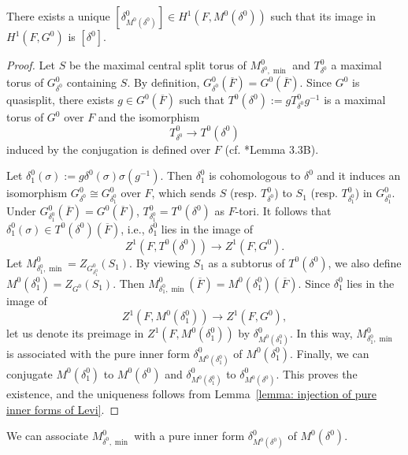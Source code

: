 \documentclass[11pt,letterpaper]{amsart}
\numberwithin{equation}{section}
\begin{document}
\begin{lemma}
\label{lemma: pure inner forms of Levi}
There exists a unique $[\delta^0_{M^0(\delta^0)}] \in H^1(F, M^0(\delta^0))$  such that its image in $H^1(F, G^0)$ is  $[\delta^0]$. 
\end{lemma}

\begin{proof}
Let $S$ be the maximal central split torus of $M^0_{\delta^0, \min}$ and $T^0_{\delta^0}$ a maximal torus of $G^0_{\delta^0}$ containing $S$. By definition, $G^0_{\delta^0}(\overline{F}) = G^0(\overline{F})$. Since $G^0$ is quasisplit, there exists $g \in G^0(\overline{F})$ such that $T^0(\delta^0) := gT^0_{\delta^0}g^{-1}$ is a maximal torus of $G^0$ over $F$ and the isomorphism 
\[
T^0_{\delta^0} \rightarrow T^0(\delta^0)
\]
induced by the conjugation is defined over $F$ (cf. \cite{KS99}*{Lemma 3.3B}). 

Let $\delta^0_1(\sigma) := g\delta^0(\sigma)\sigma(g^{-1})$. Then $\delta^0_1$ is cohomologous to $\delta^0$ and it induces an isomorphism $G^0_{\delta^0} \cong G^0_{\delta^0_1}$ over $F$, which sends $S$ (resp. $T^0_{\delta^0}$) to $S_1$ (resp. $T^0_{\delta^0_1}$) in $G^0_{\delta^0_1}$. Under $G^0_{\delta^0_1}(\overline{F}) = G^0(\overline{F})$, $T^0_{\delta^0_1} = T^0(\delta^0)$ as $F$-tori. It follows that $\delta^0_1(\sigma) \in T^0(\delta^0)(\overline{F})$, i.e., $\delta^0_1$ lies in the image of 
\[
Z^1(F, T^0(\delta^0)) \rightarrow Z^1(F, G^0).
\]
Let $M^0_{\delta^0_1, \min} = Z_{G^0_{\delta^0_1}}(S_1)$. By viewing $S_1$ as a subtorus of $T^0(\delta^0)$, we also define $M^0(\delta^0_1) = Z_{G^0}(S_1)$. Then $M^0_{\delta^0_1, \min}(\overline{F}) = M^0(\delta^0_1)(\overline{F})$. Since $\delta^0_1$ lies in the image of 
\[
Z^1(F, M^0(\delta^0_1)) \rightarrow Z^1(F, G^0),
\]
let us denote its preimage in $Z^1(F, M^0(\delta^0_1))$ by $\delta^0_{M^0(\delta^0_1)}$. In this way, $M^0_{\delta^0_1, \min}$ is associated with the pure inner form $\delta^0_{M^0(\delta^0_1)}$ of $M^0(\delta^0_1)$. Finally, we can conjugate $M^0(\delta^0_1)$ to $M^0(\delta^0)$ and $\delta^0_{M^0(\delta^0_1)}$ to $\delta^0_{M^0(\delta^0)}$. This proves the existence, and the uniqueness follows from Lemma~\ref{lemma: injection of pure inner forms of Levi}. 
\end{proof}

\begin{remark}
\label{remark: pure inner forms of Levi}
We can associate $M^0_{\delta^0, \min}$ with a pure inner form $\delta^0_{M^0(\delta^0)}$ of $M^0(\delta^0)$. 
\end{remark}
\end{document}
